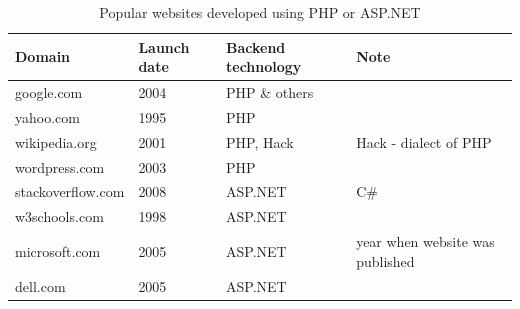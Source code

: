 \documentclass[11]{article}
\begin{document}
		\begin{table}[H]
			\caption{Popular websites developed using PHP or ASP.NET}
			  \centering
				\begin{tabular}{|l|l|l|l|}
					\hline
					\textbf{Domain} & \textbf{Launch date} & \textbf{Backend technology} & \textbf{Note}\\
					\hline
					google.com  & 2004 & PHP \& others & \\
					\hline 
					yahoo.com & 1995 & PHP  & \\
					\hline 
					wikipedia.org & 2001 & PHP, Hack  & Hack - dialect of PHP \\
					\hline 
					wordpress.com & 2003 & PHP & \\
					\hline 
					stackoverflow.com & 2008 & ASP.NET  & C\# \\
					\hline 
					w3schools.com & 1998 & ASP.NET  &  \\
					\hline 
					microsoft.com & 2005 & ASP.NET  & year when website was published  \\
					\hline 
					dell.com & 2005 & ASP.NET  & \\
					\hline 
				\end{tabular}

		\end{table}

\pagebreak



\end{document}
